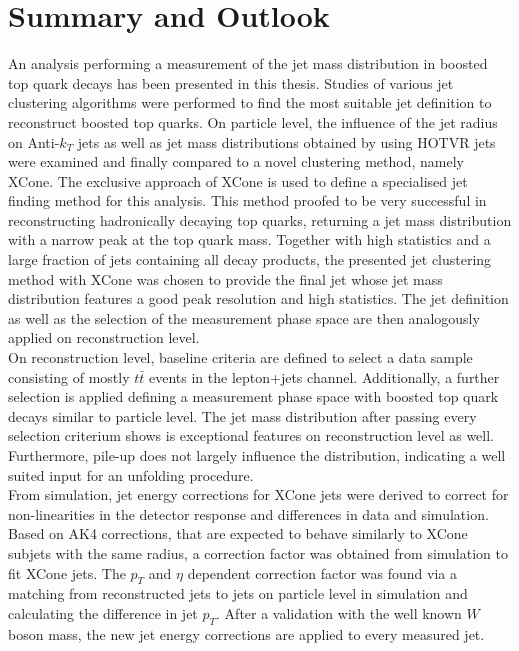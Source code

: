 \chapter{Summary and Outlook}
	An analysis performing a measurement of the jet mass distribution in boosted top quark decays has been presented in this thesis. Studies of various jet clustering algorithms were performed to find the most suitable jet definition to reconstruct boosted top quarks. On particle level, the influence of the jet radius on Anti-$k_T$ jets as well as jet mass distributions obtained by using HOTVR jets were examined and finally compared to a novel clustering method, namely XCone. The exclusive approach of XCone is used to define a specialised jet finding method for this analysis. This method proofed to be very successful in reconstructing hadronically decaying top quarks, returning a jet mass distribution with a narrow peak at the top quark mass. Together with high statistics and a large fraction of jets containing all decay products, the presented jet clustering method with XCone was chosen to provide the final jet whose jet mass distribution features a good peak resolution and high statistics. The jet definition as well as the selection of the measurement phase space are then analogously applied on reconstruction level. \\
	On reconstruction level, baseline criteria are defined to select a data sample consisting of mostly $t\bar{t}$ events in the lepton+jets channel. Additionally, a further selection is applied defining a measurement phase space with boosted top quark decays similar to particle level. The jet mass distribution after passing every selection criterium shows is exceptional features on reconstruction level as well. Furthermore, pile-up does not largely influence the distribution, indicating a well suited input for an unfolding procedure. \\
	From simulation, jet energy corrections for XCone jets were derived to correct for non-linearities in the detector response and differences in data and simulation. Based on AK4 corrections, that are expected to behave similarly to XCone subjets with the same radius, a correction factor was obtained from simulation to fit XCone jets. The $p_T$ and $\eta$ dependent correction factor was found via a matching from reconstructed jets to jets on particle level in simulation and calculating the difference in jet $p_T$. After a validation with the well known $W$ boson mass, the new jet energy corrections are applied to every measured jet.\\	
